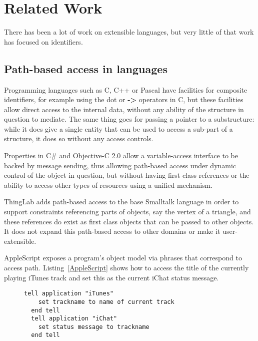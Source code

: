 \documentclass[preprint,authoryear]{acm_proc_article-sp}
\begin{document}
\section{Related Work}
\label{related-work}

There has been a lot of work on extensible languages, but very little of that work 
has focused on identifiers.  

\subsection{Path-based access in languages}

Programming languages such as C, C++ or Pascal have facilities for composite
identifiers, for example using the dot or {\bf -> } operators in C, but these facilities allow
direct access to the internal data, without any ability of the structure in question to 
mediate.  The same thing goes for passing a pointer to a substructure:  while it
does give a single entity that can be used to access a sub-part of a structure, it
does so without any access controls.

Properties in C\# and Objective-C 2.0 allow a variable-access interface to be backed by 
message sending, thus allowing path-based access under dynamic control of the object
in question, but without having first-class references or the ability to access other
types of resources using a unified mechanism.

ThingLab\cite{thinglab}  adds path-based access to the base Smalltalk language in order to support
constraints referencing parts of objects, say the vertex of a triangle, and these
references do exist as first class objects that can be passed to other objects.
   It does not
expand this path-based access to other domains or make it user-extensible.

AppleScript\cite{applescript-hopl3} exposes a program's object model via
phrases that correspond to access path.  Listing~\ref{AppleScript} shows 
how to access the title of the currently playing iTunes track and set this
as the current iChat status message.

\begin{figure}[htbp]
\begin{lstlisting}[style=L,label= AppleScript,caption=Using AppleScript to set chat status from track name.]
  tell application "iTunes"
    set trackname to name of current track
  end tell
  tell application "iChat"
    set status message to trackname
  end tell
\end{lstlisting}
\end{figure}
\end{document}
